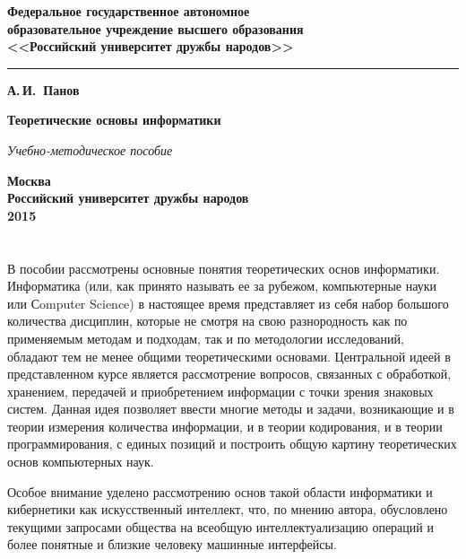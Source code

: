 \documentclass[b5paper,11pt]{book}
\begin{document}
	\begin{titlepage}
		\begin{center}
			{\bfseries  Федеральное государственное автономное \\
				образовательное учреждение высшего образования\\
				<<Российский университет дружбы народов>>
				
			}

			\vspace{-5pt}
			\noindent\rule{\textwidth}{2pt}
			
			\vspace{50pt}
			{\Large\bfseries А.\,И.~Панов}
			
			\vspace{100pt}
			{\Huge\bfseries Теоретические основы информатики}
			
			\vspace{20pt}
			{\Large\itshape Учебно-методическое пособие}
			
			\vfill
			{\bfseries Москва\\
				Российский университет дружбы народов\\
				2015
			}
		\end{center}
	\end{titlepage}
	
	\chapter*{}
	
	В пособии рассмотрены основные понятия теоретических основ информатики. Информатика (или, как принято называть ее за рубежом, компьютерные науки или Сomputer Science) в настоящее время представляет из себя набор большого количества дисциплин, которые не смотря на свою разнородность как по применяемым методам и подходам, так и по методологии исследований, обладают тем не менее общими теоретическими основами. Центральной идеей в представленном курсе является рассмотрение вопросов, связанных с обработкой, хранением, передачей и приобретением информации с точки зрения знаковых систем. Данная идея позволяет ввести многие методы и задачи, возникающие и в теории измерения количества информации, и в теории кодирования, и в теории программирования, с единых позиций и построить общую картину теоретических основ компьютерных наук.
	
	Особое внимание уделено рассмотрению основ такой области информатики и кибернетики как искусственный интеллект, что, по мнению автора, обусловлено текущими запросами общества на всеобщую интеллектуализацию операций и более понятные и близкие человеку машинные интерфейсы. 
	
\end{document}
